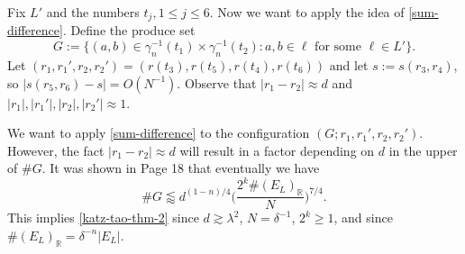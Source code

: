 \documentclass{amsart}
\numberwithin{equation}{section}
\newcommand{\ga}{\gamma}
\newcommand{\de}{\delta}
\newcommand{\la}{\lambda}
\newcommand{\ZR}{\mathbb{R}}
\begin{document}
Fix $L'$ and the numbers $t_j, 1\leq j\leq 6$.
Now we want to apply the idea of \eqref{sum-difference}.
Define the produce set
\begin{equation}
    G:=\{(a,b)\in\ga_n^{-1}(t_1)\times\ga_n^{-1}(t_2):a,b\in \ell\text{ for some }\ell\in L'\}.
\end{equation}
Let $(r_1,r_1',r_2,r_2')=(r(t_3), r(t_5), r(t_4), r(t_6))$ and let $s:=s(r_3,r_4)$, so $|s(r_5,r_6)-s|=O(N^{-1})$.
Observe that $|r_1-r_2|\approx d$ and $|r_1|, |r_1'|, |r_2|, |r_2'|\approx1$.

\smallskip

We want to apply \eqref{sum-difference} to the configuration $(G;r_1,r_1',r_2,r_2')$.
However, the fact $|r_1-r_2|\approx d$ will result in a factor depending on $d$ in the upper of $\# G$.
It was shown in \cite{Katz-Tao-Kakeya-maximal} Page 18 that eventually we have 
\begin{equation}
    \# G\lessapprox d^{(1-n)/4}\Big(\frac{2^k\#(E_L)_\ZR}{N}\Big)^{7/4}.
\end{equation}
This implies \eqref{katz-tao-thm-2} since $d\gtrsim\la^2$, $N=\de^{-1}$, $2^k\geq1$, and since $\#(E_L)_\ZR=\de^{-n}|E_L|$.

\bigskip



\end{document}
